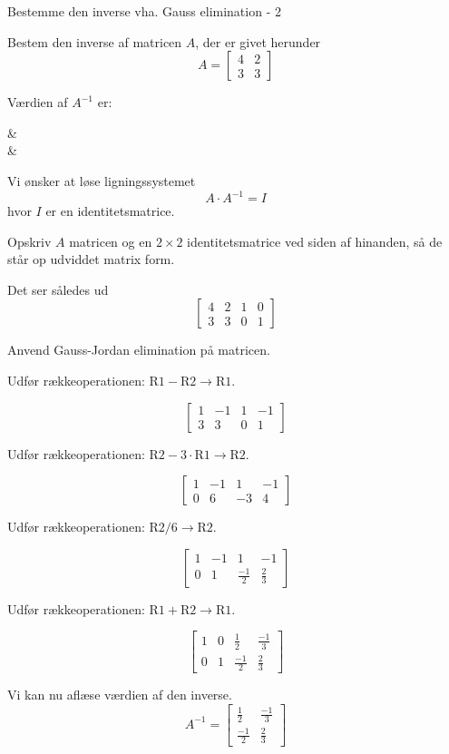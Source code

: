 \documentclass{article}
\begin{document}
\begin{exercise}{Bestemme den inverse vha. Gauss elimination - 2}

Bestem den inverse af matricen $A$, der er givet herunder
\[
A = \left[\begin{array}{cc}
4 & 2 \\ 
3 & 3
\end{array} \right]
\]

Værdien af $A^{-1}$ er:
\begin{answermatrix}
 &  \\
 & 
\end{answermatrix}

\hint
Vi ønsker at løse ligningssystemet
\[
A \cdot A^{-1} = I
\]
hvor $I$ er en identitetsmatrice.

\hint
Opskriv $A$ matricen og en $2 \times 2$ identitetsmatrice
ved siden af hinanden, så de står op udviddet matrix form.

\hint
Det ser således ud
\[
\left[\begin{array}{cc|cc}
4 & 2 & 1 & 0 \\ 
3 & 3 & 0 & 1
\end{array} \right]
\]

\hint
Anvend Gauss-Jordan elimination på matricen.

\hint
Udfør rækkeoperationen: $\text{R1} - \text{R2} \to \text{R1}$.

\hint
\[
\left[\begin{array}{cc|cc}
1 & -1 & 1 & -1 \\ 
3 & 3 & 0 & 1
\end{array} \right]
\]

\hint
Udfør rækkeoperationen: $\text{R2} - 3 \cdot \text{R1} \to \text{R2}$.

\hint
\[
\left[\begin{array}{cc|cc}
1 & -1 & 1 & -1 \\ 
0 & 6 & -3 & 4
\end{array} \right]
\]

\hint
Udfør rækkeoperationen: $\text{R2} / 6 \to \text{R2}$.

\hint
\[
\left[\begin{array}{cc|cc}
1 & -1 & 1 & -1 \\ 
0 & 1 & \frac{-1}{2} & \frac{2}{3}
\end{array} \right]
\]

\hint
Udfør rækkeoperationen: $\text{R1} + \text{R2} \to \text{R1}$.

\hint
\[
\left[\begin{array}{cc|cc}
1 & 0 & \frac{1}{2} & \frac{-1}{3} \\ 
0 & 1 & \frac{-1}{2} & \frac{2}{3}
\end{array} \right]
\]

\hint
Vi kan nu aflæse værdien af den inverse.
\[
A^{-1} = \left[\begin{array}{cc}
\frac{1}{2} & \frac{-1}{3} \\ 
\frac{-1}{2} & \frac{2}{3}
\end{array} \right]
\]


\end{exercise}
\end{document}
